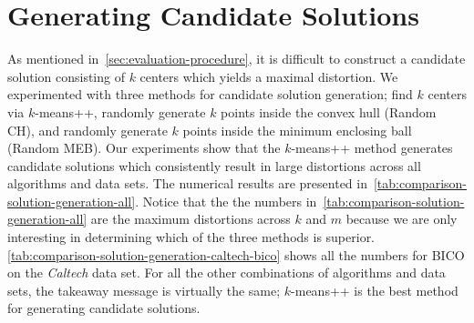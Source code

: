 \section{Generating Candidate Solutions}
\label{sec:candidate-solution-generation}
As mentioned in~\cref{sec:evaluation-procedure}, it is difficult to construct a candidate solution consisting of $k$ centers which yields a maximal distortion. We experimented with three methods for candidate solution generation; find $k$ centers via $k$-means++, randomly generate $k$ points inside the convex hull (Random CH), and randomly generate $k$ points inside the minimum enclosing ball (Random MEB). Our experiments show that the $k$-means++ method generates candidate solutions which consistently result in large distortions across all algorithms and data sets. The numerical results are presented in~\cref{tab:comparison-solution-generation-all}. Notice that the the numbers in~\cref{tab:comparison-solution-generation-all} are the maximum distortions across $k$ and $m$ because
we are only interesting in determining which of the three methods is superior. \cref{tab:comparison-solution-generation-caltech-bico} shows all the numbers for BICO on the \textit{Caltech} data set. For all the other combinations of algorithms and data sets, the takeaway message is virtually the same; $k$-means++ is the best method for generating candidate solutions.


